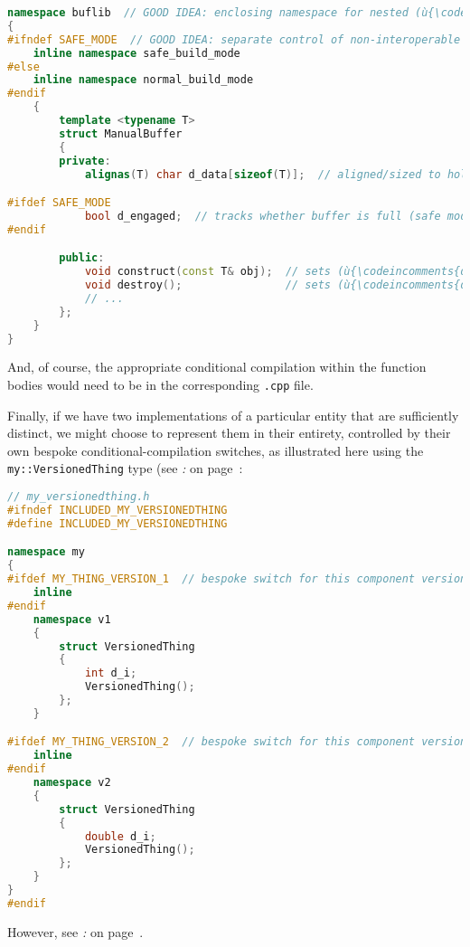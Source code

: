 \begin{lstlisting}[language=C++]
namespace buflib  // GOOD IDEA: enclosing namespace for nested (ù{\codeincomments{inline}}ù) namespace
{
#ifndef SAFE_MODE  // GOOD IDEA: separate control of non-interoperable versions
    inline namespace safe_build_mode
#else
    inline namespace normal_build_mode
#endif
    {
        template <typename T>
        struct ManualBuffer
        {
        private:
            alignas(T) char d_data[sizeof(T)];  // aligned/sized to hold a (ù{\codeincomments{T}}ù)

#ifdef SAFE_MODE
            bool d_engaged;  // tracks whether buffer is full (safe mode only)
#endif

        public:
            void construct(const T& obj);  // sets (ù{\codeincomments{d\_engaged}}ù) (safe mode only)
            void destroy();                // sets (ù{\codeincomments{d\_engaged}}ù) (safe mode only)
            // ...
        };
    }
}
\end{lstlisting}
    
\noindent And, of course, the appropriate conditional compilation within the
function bodies would need to be in the corresponding \texttt{.cpp}
file.

Finally, if we have two implementations of a particular entity that are
sufficiently distinct, we might choose to represent them in their
entirety, controlled by their own bespoke conditional-compilation
switches, as illustrated here using the \texttt{my::VersionedThing} type
(see \textit{: } on page~\pageref{link-safe-abi-versioning}:

\begin{lstlisting}[language=C++]
// my_versionedthing.h
#ifndef INCLUDED_MY_VERSIONEDTHING
#define INCLUDED_MY_VERSIONEDTHING

namespace my
{
#ifdef MY_THING_VERSION_1  // bespoke switch for this component version
    inline
#endif
    namespace v1
    {
        struct VersionedThing
        {
            int d_i;
            VersionedThing();
        };
    }

#ifdef MY_THING_VERSION_2  // bespoke switch for this component version
    inline
#endif
    namespace v2
    {
        struct VersionedThing
        {
            double d_i;
            VersionedThing();
        };
    }
}
#endif
\end{lstlisting}
    
\noindent However, see \textit{: } on page~\pageref{inline-namespace-based-versioning-doesn’t-scale}.

